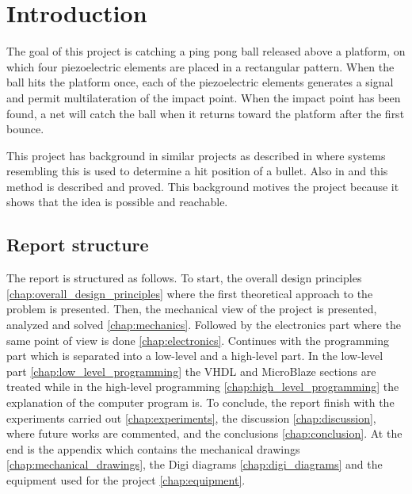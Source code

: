 \chapter{Introduction}
\label{chap:introduction}
		The goal of this project is catching a ping pong ball released above a platform, on which four piezoelectric elements are placed in a rectangular pattern.
		When the ball hits the platform once, each of the piezoelectric elements generates a signal and permit multilateration of the impact point. When the impact point has been found, a net will catch the ball when it returns toward the platform after the first bounce.

		This project has background in similar projects as described in \cite{electronic_target} where systems resembling this is used to determine a hit position of a bullet. Also in \cite{tdoa_book} and \cite{tdoa_notes} this method is described and proved. This background motives the project because it shows that the idea is possible and reachable.
	\section{Report structure}
	\label{sec:reportStructure}
		The report is structured as follows. To start, the overall design principles \ref{chap:overall_design_principles} where the first theoretical approach to the problem is presented.
		Then, the mechanical view of the project is presented, analyzed and solved \ref{chap:mechanics}.
		Followed by the electronics part where the same point of view is done \ref{chap:electronics}.
		Continues with the programming part which is separated into a low-level and a high-level part.
		In the low-level part \ref{chap:low_level_programming} the VHDL and MicroBlaze sections are treated while in the high-level programming \ref{chap:high_level_programming} the explanation of the computer program is.
		To conclude, the report finish with the experiments carried out \ref{chap:experiments}, the discussion \ref{chap:discussion}, where future works are commented, and the conclusions \ref{chap:conclusion}.
		At the end is the appendix which contains the mechanical drawings \ref{chap:mechanical_drawings}, the Digi diagrams \ref{chap:digi_diagrams} and the equipment used for the project \ref{chap:equipment}.
